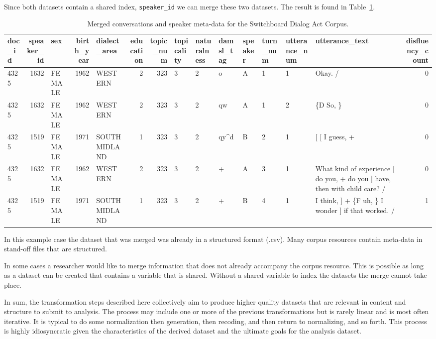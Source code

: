 \documentclass[
  letterpaper,
]{scrbook}
\begin{document}
Since both datasets contain a shared index, \texttt{speaker\_id} we can
merge these two datasets. The result is found in
Table~\ref{tbl-merging-swda-speaker-added}.

\hypertarget{tbl-merging-swda-speaker-added}{}
\begin{table}
\caption{\label{tbl-merging-swda-speaker-added}Merged conversations and speaker meta-data for the Switchboard Dialog
Act Corpus. }\tabularnewline

\centering
\begin{tabular}{lrlrlrrlllllllr}
\toprule
doc\_id & speaker\_id & sex & birth\_year & dialect\_area & education & topic\_num & topicality & naturalness & damsl\_tag & speaker & turn\_num & utterance\_num & utterance\_text & disfluency\_count\\
\midrule
4325 & 1632 & FEMALE & 1962 & WESTERN & 2 & 323 & 3 & 2 & o & A & 1 & 1 & Okay.  / & 0\\
4325 & 1632 & FEMALE & 1962 & WESTERN & 2 & 323 & 3 & 2 & qw & A & 1 & 2 & \{D So, \} & 0\\
4325 & 1519 & FEMALE & 1971 & SOUTH MIDLAND & 1 & 323 & 3 & 2 & qy\textasciicircum{}d & B & 2 & 1 & {}[ [ I guess, + & 0\\
4325 & 1632 & FEMALE & 1962 & WESTERN & 2 & 323 & 3 & 2 & + & A & 3 & 1 & What kind of experience [ do you, + do you ] have, then with child care? / & 0\\
4325 & 1519 & FEMALE & 1971 & SOUTH MIDLAND & 1 & 323 & 3 & 2 & + & B & 4 & 1 & I think, ] + \{F uh, \} I wonder ] if that worked. / & 1\\
\bottomrule
\end{tabular}
\end{table}

In this example case the dataset that was merged was already in a
structured format (.csv). Many corpus resources contain meta-data in
stand-off files that are structured.

In some cases a researcher would like to merge information that does not
already accompany the corpus resource. This is possible as long as a
dataset can be created that contains a variable that is shared. Without
a shared variable to index the datasets the merge cannot take place.

In sum, the transformation steps described here collectively aim to
produce higher quality datasets that are relevant in content and
structure to submit to analysis. The process may include one or more of
the previous transformations but is rarely linear and is most often
iterative. It is typical to do some normalization then generation, then
recoding, and then return to normalizing, and so forth. This process is
highly idiosyncratic given the characteristics of the derived dataset
and the ultimate goals for the analysis dataset.
\end{document}
